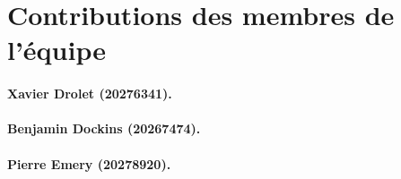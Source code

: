 \documentclass[12pt]{article}
\begin{document}
 
\section{Contributions des membres de l'équipe}
 
\paragraph{Xavier Drolet (20276341).}
 
\paragraph{Benjamin Dockins (20267474).}
 
\paragraph{Pierre Emery (20278920).}
 
 
\printbibliography
 
\end{document}

